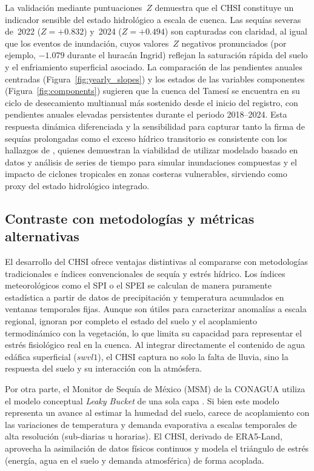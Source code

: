 \documentclass[12pt, a4paper]{article}
\begin{document}
La validación mediante puntuaciones~$Z$ demuestra que el CHSI constituye un indicador sensible del estado hidrológico a escala de cuenca. Las sequías severas de~2022 ($Z = +0.832$) y~2024 ($Z = +0.494$) son capturadas con claridad, al igual que los eventos de inundación, cuyos valores~$Z$ negativos pronunciados (por ejemplo, $-1.079$ durante el huracán Ingrid) reflejan la saturación rápida del suelo y el enfriamiento superficial asociado. La comparación de las pendientes anuales centradas (Figura~\ref{fig:yearly_slopes}) y los estados de las variables componentes (Figura~\ref{fig:components}) sugieren que la cuenca del Tamesí se encuentra en su ciclo de desecamiento multianual más sostenido desde el inicio del registro, con pendientes anuales elevadas persistentes durante el periodo 2018--2024. Esta respuesta dinámica diferenciada y la sensibilidad para capturar tanto la firma de sequías prolongadas como el exceso hídrico transitorio es consistente con los hallazgos de \textcite{rostami2025simulating}, quienes demuestran la viabilidad de utilizar modelado basado en datos y análisis de series de tiempo para simular inundaciones compuestas y el impacto de ciclones tropicales en zonas costeras vulnerables, sirviendo como proxy del estado hidrológico integrado.

\subsection{Contraste con metodologías y métricas alternativas}

El desarrollo del CHSI ofrece ventajas distintivas al compararse con metodologías tradicionales e índices convencionales de sequía y estrés hídrico. Los índices meteorológicos como el SPI \parencite{mckee1993relationship} o el SPEI \parencite{vicente2010multiscalar} se calculan de manera puramente estadística a partir de datos de precipitación y temperatura acumulados en ventanas temporales fijas. Aunque son útiles para caracterizar anomalías a escala regional, ignoran por completo el estado del suelo y el acoplamiento termodinámico con la vegetación, lo que limita su capacidad para representar el estrés fisiológico real en la cuenca. Al integrar directamente el contenido de agua edáfica superficial ($swvl1$), el CHSI captura no solo la falta de lluvia, sino la respuesta del suelo y su interacción con la atmósfera.

Por otra parte, el Monitor de Sequía de México (MSM) de la CONAGUA utiliza el modelo conceptual \emph{Leaky Bucket} de una sola capa \parencite{lobato2016monitor}. Si bien este modelo representa un avance al estimar la humedad del suelo, carece de acoplamiento con las variaciones de temperatura y demanda evaporativa a escalas temporales de alta resolución (sub-diarias u horarias). El CHSI, derivado de ERA5-Land, aprovecha la asimilación de datos físicos continuos y modela el triángulo de estrés (energía, agua en el suelo y demanda atmosférica) de forma acoplada.
\end{document}
